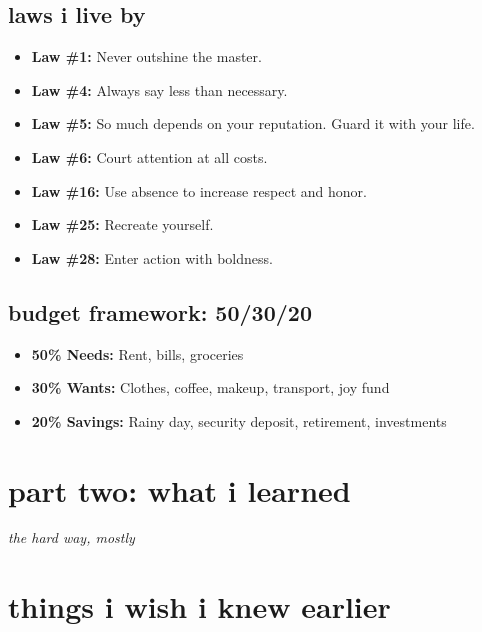 \documentclass[12pt, letterpaper]{article}
\begin{document}
\subsection{laws i live by}
\begin{itemize}
  \item \textbf{Law \#1:} Never outshine the master.
  \item \textbf{Law \#4:} Always say less than necessary.
  \item \textbf{Law \#5:} So much depends on your reputation. Guard it with your life.
  \item \textbf{Law \#6:} Court attention at all costs.
  \item \textbf{Law \#16:} Use absence to increase respect and honor.
  \item \textbf{Law \#25:} Recreate yourself.
  \item \textbf{Law \#28:} Enter action with boldness.
\end{itemize}

\subsection{budget framework: 50/30/20}
\begin{itemize}
  \item \textbf{50\% Needs:} Rent, bills, groceries
  \item \textbf{30\% Wants:} Clothes, coffee, makeup, transport, joy fund
  \item \textbf{20\% Savings:} Rainy day, security deposit, retirement, investments
\end{itemize}

\newpage
\section*{\color{matcha} part two: what i learned}
\vspace{-0.5em}
{\small\color{gray}\itshape the hard way, mostly}
\vspace{1em}

\section{things i wish i knew earlier}
\end{document}
